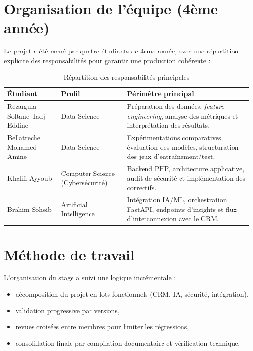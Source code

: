 \documentclass[12pt,a4paper]{report}
\begin{document}
\section{Organisation de l'\'{e}quipe (4\`{e}me ann\'{e}e)}

Le projet a \'{e}t\'{e} men\'{e} par quatre \'{e}tudiants de 4\`{e}me ann\'{e}e, avec une r\'{e}partition explicite des responsabilit\'{e}s pour garantir une production coh\'{e}rente :

\begin{table}[H]
\centering
\caption{R\'{e}partition des responsabilit\'{e}s principales}
\label{tab:team_roles}
\begin{tabularx}{\textwidth}{l l X}
\toprule
\textbf{\'{E}tudiant} & \textbf{Profil} & \textbf{P\'{e}rim\`{e}tre principal} \\
\midrule
Rezaiguia Soltane Tadj Eddine & Data Science & Pr\'{e}paration des donn\'{e}es, \textit{feature engineering}, analyse des m\'{e}triques et interpr\'{e}tation des r\'{e}sultats. \\
Bellatreche Mohamed Amine & Data Science & Exp\'{e}rimentations comparatives, \'{e}valuation des mod\`{e}les, structuration des jeux d'entra\^{i}nement/test. \\
Khelifi Ayyoub & Computer Science (Cybers\'{e}curit\'{e}) & Backend PHP, architecture applicative, audit de s\'{e}curit\'{e} et impl\'{e}mentation des correctifs. \\
Brahim Soheib & Artificial Intelligence & Int\'{e}gration IA/ML, orchestration FastAPI, endpoints d'insights et flux d'interconnexion avec le CRM. \\
\bottomrule
\end{tabularx}
\end{table}

\section{M\'{e}thode de travail}

L'organisation du stage a suivi une logique incr\'{e}mentale :
\begin{itemize}
  \item d\'{e}composition du projet en lots fonctionnels (CRM, IA, s\'{e}curit\'{e}, int\'{e}gration),
  \item validation progressive par versions,
  \item revues crois\'{e}es entre membres pour limiter les r\'{e}gressions,
  \item consolidation finale par compilation documentaire et v\'{e}rification technique.
\end{itemize}
\end{document}
